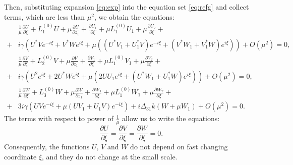 \documentclass[a4paper, 12pt, onecolumn]{extarticle}
\begin{document}
Then, substituting expansion \eqref{eq:exp} into the equation set \eqref{eq:refg} and collect terms, which are less than \(\mu^2\), we obtain the equations:
\begin{equation}
\label{eq:allset}
\begin{aligned}
&\frac{1}{\mu}\frac{\partial U}{\partial \xi}+L_1^{(0)}U+\mu \frac{\partial U}{\partial z_1}+\frac{\partial U_1}{\partial\xi}+\mu L_1^{(0)}U_1+\mu\frac{\partial U_2}{\partial \xi}+\\
+&i\gamma\left(U^*Ve^{-i\xi}+V^*We^{i\xi}+\mu((U^*V_1+U_1^*V)e^{-i\xi}+(V^*W_1+V_1^*W)e^{i\xi})\right)+O(\mu^2)=0,\\
&\frac{1}{\mu}\frac{\partial V}{\partial \xi}+L_2^{(0)}V+\mu \frac{\partial V}{\partial z_1}+\frac{\partial V_1}{\partial\xi}+\mu L_1^{(0)}V_1+\mu\frac{\partial V_2}{\partial \xi}+\\
+&i\gamma\left(U^2e^{i\xi}+2U^*We^{i\xi}+\mu(2UU_1e^{i\xi}+(U^*W_1+U_1^*W)e^{i\xi})\right)+O(\mu^2)=0,\\
&\frac{1}{\mu}\frac{\partial W}{\partial \xi}+L_3^{(0)}W+\mu \frac{\partial W}{\partial z_1}+\frac{\partial W_1}{\partial\xi}+\mu L_1^{(0)}W_1+\mu\frac{\partial W_2}{\partial \xi}+\\
+&3i\gamma \left(UVe^{-i\xi}+\mu(UV_1+U_1V)e^{-i\xi}\right)+i\Delta_{31}k(W+\mu W_1)+O(\mu^2)=0.
\end{aligned}
\end{equation}
The terms with respect to power of \(\frac{1}{\mu}\) allow us to write the equations:
\[\frac{\partial U}{\partial \xi}=\frac{\partial V}{\partial \xi}=\frac{\partial W}{\partial \xi}=0.\]
 Consequently, the functions \(U,\,V\) and \(W\) do not depend on fast changing coordinate \(\xi\), and they do not change at the small scale.
\end{document}
